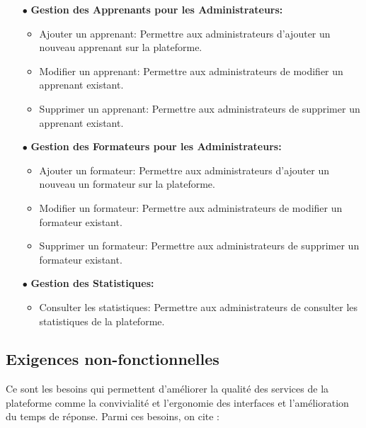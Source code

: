 \begin{itemize}
\begin{itemize}
    \end{itemize}
    \item[$\bullet$] \textbf{Gestion des Apprenants pour les Administrateurs:}
    \begin{itemize}
        \item  Ajouter un apprenant: Permettre aux administrateurs d'ajouter un nouveau apprenant sur la plateforme.
        \item  Modifier un apprenant: Permettre aux administrateurs de modifier un apprenant existant.
        \item  Supprimer un apprenant: Permettre aux administrateurs de supprimer un apprenant existant.
    \end{itemize}
    \item[$\bullet$] \textbf{Gestion des Formateurs pour les Administrateurs:}
    \begin{itemize}
        \item  Ajouter un formateur: Permettre aux administrateurs d'ajouter un nouveau un formateur sur la plateforme.
        \item  Modifier un formateur: Permettre aux administrateurs de modifier un formateur existant.
        \item  Supprimer un formateur: Permettre aux administrateurs de supprimer un formateur existant.
    \end{itemize}
    \item[$\bullet$] \textbf{Gestion des Statistiques:}
    \begin{itemize}
        \item  Consulter les statistiques: Permettre aux administrateurs de consulter les statistiques de la plateforme.
    \end{itemize}
\end{itemize}


\subsection{Exigences non-fonctionnelles}


Ce sont les besoins qui permettent d’améliorer la qualité des services de la plateforme comme la convivialité et l’ergonomie des interfaces et l’amélioration du temps de réponse. Parmi ces besoins, on cite :

